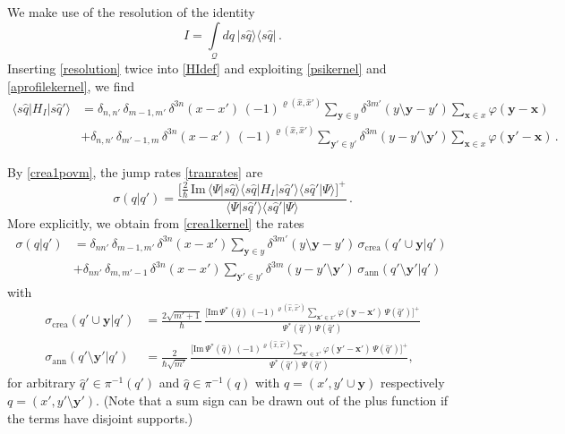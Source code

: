 \documentclass[12pt]{article}
\newcommand{\1}{\mathbf{1}} %
\renewcommand{\Im}{\mathrm{Im}} %
\renewcommand{\sp}[2]{\langle #1 | #2 \rangle} %
\newcommand{\conf}{\mathcal{Q}} %
\newcommand{\profile}{\varphi}
\newcommand{\covering}{\pi} %
\newcommand{\permutation}{\varrho} %
\newcommand{\vx}{{\boldsymbol x}} %
\newcommand{\vy}{{\boldsymbol y}}
\newcommand{\inter}{{I}} %
\newcommand{\crea}{{\mathrm{crea}}} %
\newcommand{\ann}{{\mathrm{ann}}} %
\begin{document}
We make use of the resolution of the identity
\begin{equation}\label{resolution}
   I = \int\limits_{\conf} dq \, |s\hat{q} \rangle \langle
   s\hat{q}|\,.
\end{equation}
Inserting \eqref{resolution} twice into \eqref{HIdef} and exploiting
\eqref{psikernel} and \eqref{aprofilekernel}, we find
\begin{equation}\label{crea1kernel}
\begin{split}
   \sp{s\hat{q}} {H_\inter| s\hat{q}'} &= \delta_{n,n'} \,
   \delta_{m-1,m'} \, \delta^{3n}(x-x') \,
   (-1)^{\permutation(\hat{x},\hat{x}')} \sum_{\vy \in y} \delta^{3m'}
   (y \setminus \vy - y') \sum_{\vx \in x} \profile(\vy - \vx) \:  \\
   &+ \delta_{n,n'} \, \delta_{m'-1,m} \,
   \delta^{3n}(x-x') \, (-1)^{\permutation(\hat{x},\hat{x}')}
   \sum_{\vy' \in y'} \delta^{3m} (y - y' \setminus \vy') \sum_{\vx \in
   x} \profile(\vy' - \vx)\,.
\end{split}
\end{equation}

By \eqref{crea1povm}, the jump rates \eqref{tranrates} are
\begin{equation}
   \sigma(q|q') = \frac{\Big[\tfrac{2}{\hbar} \, \Im \,
   \sp{\Psi}{s\hat{q}} \sp{s\hat{q}}{H_\inter| s\hat{q}'}
\sp{s\hat{q}'}{\Psi}
   \Big]^+} {\sp{\Psi}{s\hat{q}'} \sp{s\hat{q}'}{\Psi}} \,.
\end{equation}
More explicitly, we obtain from \eqref{crea1kernel} the rates
\begin{equation}\label{crea1rates}
\begin{split}
   \sigma(q|q') &= \delta_{nn'} \,\delta_{m-1,m'} \,\delta^{3n}(x-x')
   \sum_{\vy \in y} \delta^{3m'}(y\setminus \vy-y') \,
   \sigma_\crea(q'\cup \vy|q') \:  \\
   &+\delta_{nn'}\,\delta_{m,m'-1} \, \delta^{3n}(x-x') \sum_{\vy' \in
   y'} \delta^{3m}(y - y'\setminus \vy') \, \sigma_\ann(q'\setminus
   \vy'|q')
\end{split}
\end{equation}
with
\begin{subequations}
\begin{align}
   \sigma_\crea(q'\cup \vy|q')&= \frac{2 \sqrt{m'+1}}{\hbar} \,
   \frac{\Big[ \Im \, \Psi^*(\hat{q}) \,
   (-1)^{\permutation(\hat{x},\hat{x}')} \sum\limits_{\vx' \in x'}
   \varphi(\vy-\vx') \, \Psi(\hat{q}')\Big]^+}{ \Psi^*(\hat{q}') \,
   \Psi(\hat{q}')} \label{crea1crearate} \\
   \sigma_\ann(q'\setminus \vy'|q')&= \frac{2} {\hbar \sqrt{m'}}
   \,\frac{\Big[\Im \, \Psi^*(\hat{q}) \,
   (-1)^{\permutation(\hat{x},\hat{x}')} \sum\limits_{\vx' \in x'}
   \varphi(\vy'-\vx') \, \Psi(\hat{q}') \Big]^+}{ \Psi^*(\hat{q}') \,
   \Psi(\hat{q}')} , \label{crea1annrate}
\end{align}
\end{subequations}
for arbitrary $\hat{q}' \in \covering^{-1}(q')$ and $\hat{q} \in
\covering^{-1}(q)$ with $q=(x',y'\cup\vy)$ respectively $q=(x',y'
\setminus \vy')$.  (Note that a sum sign can be drawn out of the plus
function if the terms have disjoint supports.)
\end{document}
